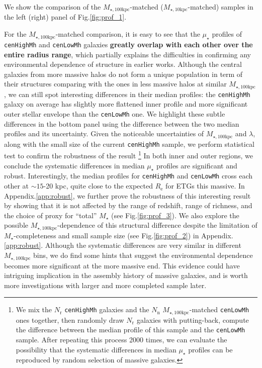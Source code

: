 \documentclass{emulateapj}
\def\rbcg{\texttt{cenHighMh}}
\def\nbcg{\texttt{cenLowMh}}
\def\mstar{{$M_{\star}$}}
\def\minn{{$M_{\star,10\mathrm{kpc}}$}}
\def\mtot{{$M_{\star,100\mathrm{kpc}}$}}
\def\mden{{$\mu_{\star}$}}
\begin{document}
\begin{CJK*}{UTF8}{gbsn}
    We show the comparison of the \mtot{}-matched (\minn{}-matched) samples in the 
    left (right) panel of Fig.\ref{fig:prof_1}. 

    For the \mtot{}-matched comparison, it is easy to see that the \mden{}
    profiles of \rbcg{} and \nbcg{} galaxies \textbf{greatly overlap with each 
    other over the entire radius range}, which partially explains the difficulties in 
    confirming any environmental dependence of structure in earlier works.
    Although the central galaxies from more massive halos do not form a unique 
    population in term of their structures comparing with the ones in less massive
    halos at similar \mtot{}, we can still spot interesting differences in their 
    median profiles: the \rbcg{} galaxy on average has slightly more flattened inner 
    profile and more significant outer stellar envelope than the \nbcg{} one.
    We highlight these subtle differences in the bottom panel using the difference 
    between the two median profiles and its uncertainty. 
    Given the noticeable uncertainties of \mtot{} and $\lambda$, along with the 
    small size of the current \rbcg{} sample, we perform statistical test to confirm 
    the robustness of the result \footnote{We mix the $N_{\mathrm{r}}$ \rbcg{} 
    galaxies and the $N_{\mathrm{n}}$ \mtot{}-matched \nbcg{} ones together, then 
    randomly draw $N_{\mathrm{r}}$ galaxies with putting-back, compute the difference 
    between the median profile of this sample and the \nbcg{} sample. 
    After repeating this process 2000 times, we can evaluate the possibility that 
    the systematic differences in median \mden{} profiles can be reproduced by random 
    selection of massive galaxies.}
    In both inner and outer regions, we conclude the systematic differences in 
    median \mden{} profiles are significant and robust.
    Interestingly, the median profiles for \rbcg{} and \nbcg{} cross each other 
    at $\sim 15$-20 kpc, quite close to the expected $R_{\mathrm{e}}$ for ETGs 
    this massive. 
    In Appendix.\ref{app:robust}, we further prove the robustness of this 
    interesting result by showing that it is not affected by the range of redshift,
    range of richness, and the choice of proxy for ``total'' \mstar{} 
    (see Fig.\ref{fig:prof_3}). 
    We also explore the possible \mtot{}-dependence of this structural difference 
    despite the limitation of \mstar{}-completeness and small sample size
    (see Fig.\ref{fig:prof_2}) in Appendix.\ref{app:robust}.
    Although the systematic differences are very similar in different \mtot{} bins, 
    we do find some hints that suggest the environmental dependence becomes more 
    significant at the more massive end.  
    This evidence could have intriguing implication in the assembly history of 
    massive galaxies, and is worth more investigations with larger and more completed 
    sample later.  


\end{CJK*}
\end{document}
